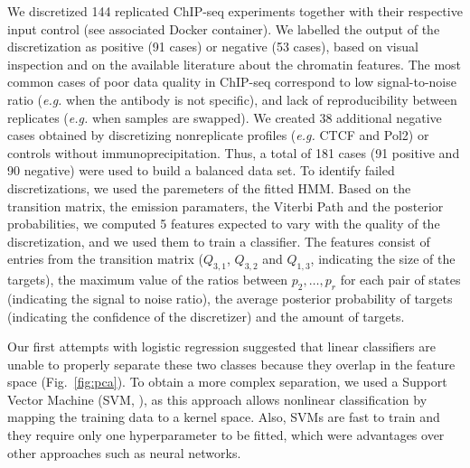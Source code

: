 \documentclass{bioinfo}
\begin{document}
\begin{methods}
We discretized 144 replicated ChIP-seq experiments together with their
respective input control (see associated Docker container).
We labelled the output of the discretization as positive (91 cases)
or negative (53 cases), based on visual inspection and on the available
literature about the chromatin features. The most common cases of
poor data quality in ChIP-seq correspond to low signal-to-noise ratio
(\textit{e.g.} when the antibody is not specific), and lack of
reproducibility between replicates (\textit{e.g.} when samples are
swapped). We created 38 additional negative cases obtained by discretizing
nonreplicate profiles (\textit{e.g.} CTCF and Pol2) or controls without
immunoprecipitation. Thus, a total of 181 cases (91 positive and 90
negative) were used to build a balanced data set.
To identify failed discretizations, we used the paremeters of the
fitted HMM. Based on the transition matrix, the emission paramaters,
the Viterbi Path and the posterior probabilities,
we computed 5 features expected to vary with the quality
of the discretization, and we used them to train a classifier.
The features consist of entries from the transition matrix ($Q_{3,1}$,
$Q_{3,2}$ and $Q_{1,3}$, indicating the size of the targets), the
maximum value of the ratios between $p_2, \ldots, p_r$ for each
pair of states (indicating the signal to noise ratio), the average
posterior probability of targets (indicating the confidence of the
discretizer) and the amount of targets.

Our first attempts with logistic regression suggested that linear
classifiers are unable to properly separate these two classes because
they overlap in the feature space (Fig.~\ref{fig:pca}). To obtain a
more complex separation, we used a Support Vector Machine
(SVM, \citealp{Chang2011,e1071}), as this approach
allows nonlinear classification by mapping
the training data to a kernel space. Also, SVMs are fast to train and
they require only one hyperparameter to be fitted, which were
advantages over other approaches such as neural networks.


\end{methods}
\end{document}
